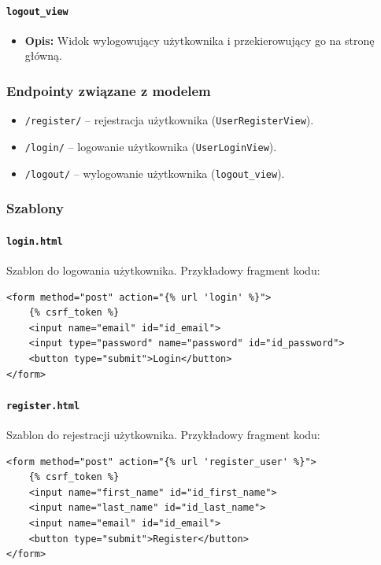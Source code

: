 \documentclass[12pt,a4paper,oneside]{article}
\theoremstyle{definition}
\numberwithin{equation}{section}
\begin{document}
\paragraph{\texttt{logout\_view}}
\begin{itemize}
    \item \textbf{Opis:} Widok wylogowujący użytkownika i przekierowujący go na stronę główną.
\end{itemize}

\subsubsection*{Endpointy związane z modelem}

\begin{itemize}
    \item \texttt{/register/} – rejestracja użytkownika (\texttt{UserRegisterView}).
    \item \texttt{/login/} – logowanie użytkownika (\texttt{UserLoginView}).
    \item \texttt{/logout/} – wylogowanie użytkownika (\texttt{logout\_view}).
\end{itemize}

\subsubsection*{Szablony}

\paragraph{\texttt{login.html}}

Szablon do logowania użytkownika. Przykładowy fragment kodu:
\begin{verbatim}
<form method="post" action="{% url 'login' %}">
    {% csrf_token %}
    <input name="email" id="id_email">
    <input type="password" name="password" id="id_password">
    <button type="submit">Login</button>
</form>
\end{verbatim}

\paragraph{\texttt{register.html}}

Szablon do rejestracji użytkownika. Przykładowy fragment kodu:
\begin{verbatim}
<form method="post" action="{% url 'register_user' %}">
    {% csrf_token %}
    <input name="first_name" id="id_first_name">
    <input name="last_name" id="id_last_name">
    <input name="email" id="id_email">
    <button type="submit">Register</button>
</form>
\end{verbatim}
\end{document}

